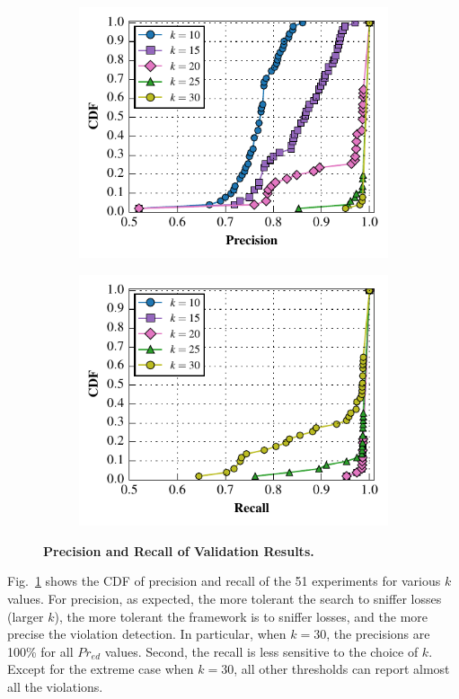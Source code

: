 \begin{figure}[t!]
  \centering
  \begin{subfigure}{0.48\textwidth}
    \includegraphics[width=\textwidth]{./figures/scripts/PrecisionFigure.pdf}
  \end{subfigure}
  \begin{subfigure}{0.48\textwidth}
    \includegraphics[width=\textwidth]{./figures/scripts/RecallFigure.pdf}
  \end{subfigure}
  \caption{\textbf{Precision and Recall of Validation Results.}}
  \label{fig:precision}
\end{figure}

Fig.~\ref{fig:precision} shows the CDF of precision and recall of the 51
experiments for various $k$ values. For precision, as expected, the more
tolerant the search to sniffer losses (larger $k$), the more tolerant the
framework is to sniffer losses, and the more precise the violation detection. In
particular, when $k=30$, the precisions are 100\% for all $Pr_{ed}$ values.
Second, the recall is less sensitive to the choice of $k$.  Except for the
extreme case when $k=30$, all other thresholds can report almost all the
violations.
